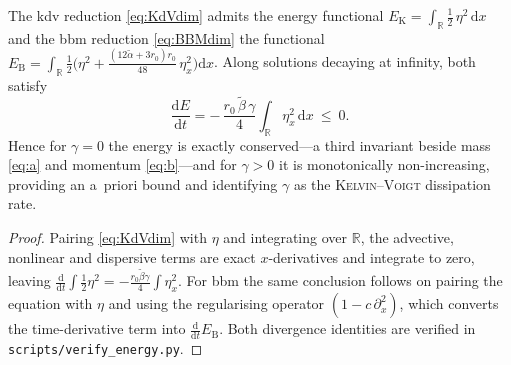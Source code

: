 \documentclass[alpha-refs, 12pt]{wiley-article}
\newcommand{\ud}{\mathrm{d}}
\begin{document}
\begin{lemma}\label{lem:energy}
The \acrshort{kdv} reduction \eqref{eq:KdVdim} admits the energy functional $E_{\mathrm{K}}=\int_{\mathbb{R}}\tfrac12\,\eta^{2}\,\ud x$ and the \acrshort{bbm} reduction \eqref{eq:BBMdim} the functional $E_{\mathrm{B}}=\int_{\mathbb{R}}\tfrac12\bigl(\eta^{2}+\tfrac{(12\tilde{\alpha}+3r_{0})r_{0}}{48}\,\eta_{x}^{2}\bigr)\ud x$. Along solutions decaying at infinity, both satisfy
\begin{equation}\label{eq:energy_balance}
  \frac{\ud E}{\ud t}=-\,\frac{r_{0}\,\tilde{\beta}\,\gamma}{4}\int_{\mathbb{R}}\eta_{x}^{2}\,\ud x\ \le\ 0.
\end{equation}
Hence for $\gamma=0$ the energy is exactly conserved---a third invariant beside mass \eqref{eq:a} and momentum \eqref{eq:b}---and for $\gamma>0$ it is monotonically non-increasing, providing an a~priori bound and identifying $\gamma$ as the \textsc{Kelvin}--\textsc{Voigt} dissipation rate.
\end{lemma}
\begin{proof}
Pairing \eqref{eq:KdVdim} with $\eta$ and integrating over $\mathbb{R}$, the advective, nonlinear and dispersive terms are exact $x$-derivatives and integrate to zero, leaving $\tfrac{\ud}{\ud t}\!\int\tfrac12\eta^{2}=-\tfrac{r_{0}\tilde{\beta}\gamma}{4}\!\int\eta_{x}^{2}$. For \acrshort{bbm} the same conclusion follows on pairing the equation with $\eta$ and using the regularising operator $(1-c\,\partial_{x}^{2})$, which converts the time-derivative term into $\tfrac{\ud}{\ud t}E_{\mathrm{B}}$. Both divergence identities are verified in \texttt{scripts/verify\_energy.py}.
\end{proof}
\end{document}
